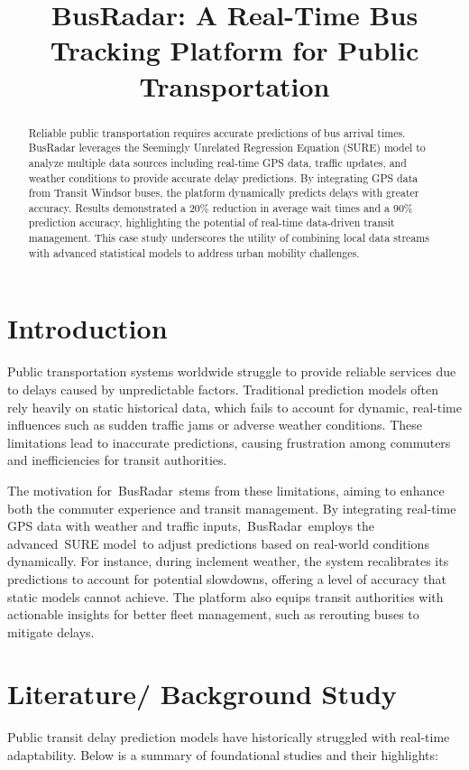\documentclass[conference]{IEEEtran}
\begin{document}
\title{BusRadar: A Real-Time Bus Tracking Platform for Public Transportation}

\maketitle

\begin{abstract}
Reliable public transportation requires accurate predictions of bus arrival times. BusRadar leverages the Seemingly Unrelated Regression Equation (SURE) model to analyze multiple data sources including real-time GPS data, traffic updates, and weather conditions to provide accurate delay predictions. By integrating GPS data from Transit Windsor buses, the platform dynamically predicts delays with greater accuracy. Results demonstrated a 20\% reduction in average wait times and a 90\% prediction accuracy, highlighting the potential of real-time data-driven transit management. This case study underscores the utility of combining local data streams with advanced statistical models to address urban mobility challenges. 
\end{abstract}

\section{Introduction}
Public transportation systems worldwide struggle to provide reliable services due to delays caused by unpredictable factors. Traditional prediction models often rely heavily on static historical data, which fails to account for dynamic, real-time influences such as sudden traffic jams or adverse weather conditions. These limitations lead to inaccurate predictions, causing frustration among commuters and inefficiencies for transit authorities. 

The motivation for BusRadar stems from these limitations, aiming to enhance both the commuter experience and transit management. By integrating real-time GPS data with weather and traffic inputs, BusRadar employs the advanced SURE model to adjust predictions based on real-world conditions dynamically. For instance, during inclement weather, the system recalibrates its predictions to account for potential slowdowns, offering a level of accuracy that static models cannot achieve. The platform also equips transit authorities with actionable insights for better fleet management, such as rerouting buses to mitigate delays. 
 
\section{Literature/ Background Study}
Public transit delay prediction models have historically struggled with real-time adaptability. Below is a summary of foundational studies and their highlights:
\end{document}
